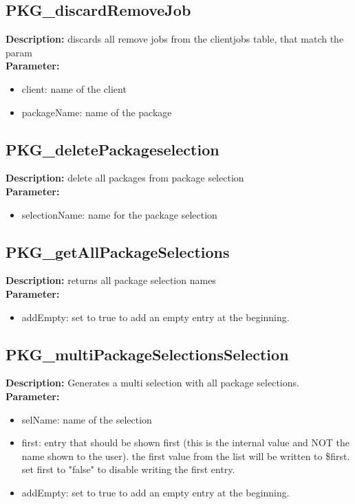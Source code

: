 \subsection{PKG\_discardRemoveJob}
\textbf{Description:} discards all remove jobs from the clientjobs table, that match the param\\
\textbf{Parameter:}
\begin{itemize}
\item client: name of the client
\item packageName: name of the package
\end{itemize}

\subsection{PKG\_deletePackageselection}
\textbf{Description:} delete all packages from package selection\\
\textbf{Parameter:}
\begin{itemize}
\item selectionName: name for the package selection
\end{itemize}

\subsection{PKG\_getAllPackageSelections}
\textbf{Description:} returns all package selection names\\
\textbf{Parameter:}
\begin{itemize}
\item addEmpty: set to true to add an empty entry at the beginning.
\end{itemize}

\subsection{PKG\_multiPackageSelectionsSelection}
\textbf{Description:} Generates a multi selection with all package selections.\\
\textbf{Parameter:}
\begin{itemize}
\item selName: name of the selection
\item first: entry that should be shown first (this is the internal value and NOT the name shown to the user). the first value from the list will be written to \$first. set first to "false" to disable writing the first entry.
\item addEmpty: set to true to add an empty entry at the beginning.
\end{itemize}

